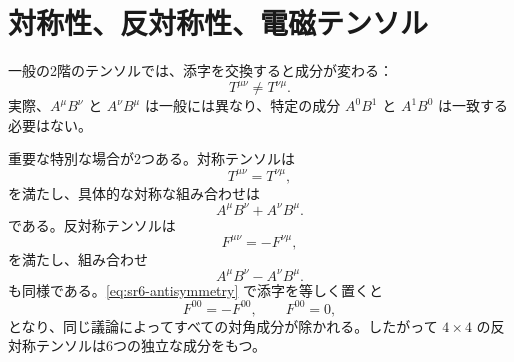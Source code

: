\begin{classroomqa}
\end{classroomqa}

\begin{classroomqa}
\end{classroomqa}

\begin{classroomqa}
\end{classroomqa}

\section{対称性、反対称性、電磁テンソル}

一般の2階のテンソルでは、添字を交換すると成分が変わる：
\begin{equation}
T^{\mu\nu}\neq T^{\nu\mu}.
\end{equation}
実際、\(A^\mu B^\nu\) と \(A^\nu B^\mu\) は一般には異なり、特定の成分 \(A^0B^1\) と \(A^1B^0\) は一致する必要はない。

重要な特別な場合が2つある。対称テンソルは
\begin{equation}
T^{\mu\nu}=T^{\nu\mu},
\end{equation}
を満たし、具体的な対称な組み合わせは
\begin{equation}
A^\mu B^\nu+A^\nu B^\mu.
\end{equation}
である。反対称テンソルは
\begin{equation}
F^{\mu\nu}=-F^{\nu\mu},
\label{eq:sr6-antisymmetry}
\end{equation}
を満たし、組み合わせ
\begin{equation}
A^\mu B^\nu-A^\nu B^\mu.
\end{equation}
も同様である。\eqref{eq:sr6-antisymmetry} で添字を等しく置くと
\begin{equation}
F^{00}=-F^{00},
\qquad
F^{00}=0,
\end{equation}
となり、同じ議論によってすべての対角成分が除かれる。したがって \(4\times4\) の反対称テンソルは6つの独立な成分をもつ。

